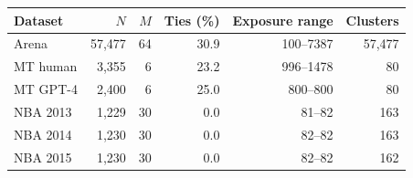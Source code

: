 \begin{tabular}{lrrrrr}\toprule Dataset & $N$ & $M$ & Ties (\%) & Exposure range & Clusters \\ \midrule
Arena & 57,477 & 64 & 30.9 & 100--7387 & 57,477 \\
MT human & 3,355 & 6 & 23.2 & 996--1478 & 80 \\
MT GPT-4 & 2,400 & 6 & 25.0 & 800--800 & 80 \\
NBA 2013 & 1,229 & 30 & 0.0 & 81--82 & 163 \\
NBA 2014 & 1,230 & 30 & 0.0 & 82--82 & 163 \\
NBA 2015 & 1,230 & 30 & 0.0 & 82--82 & 162 \\
\bottomrule
\end{tabular}
